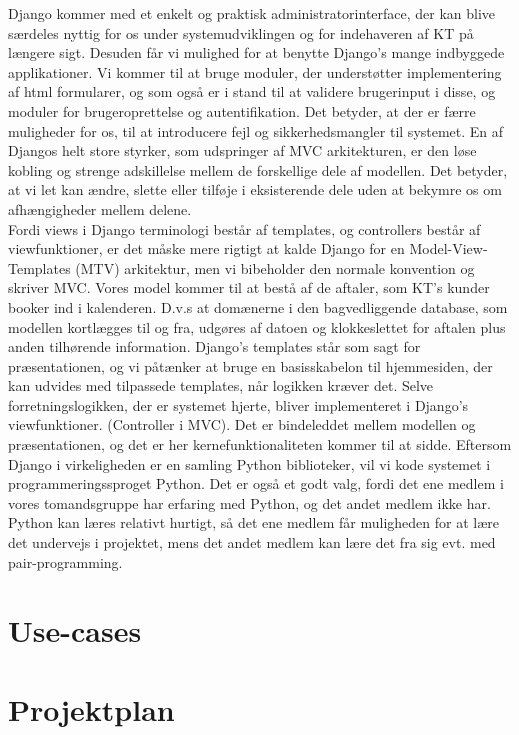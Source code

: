 \documentclass[12pt]{article}   %
\begin{document}
Django kommer med et enkelt og praktisk administratorinterface, der kan blive
særdeles nyttig for os under systemudviklingen og for indehaveren af KT på
længere sigt. Desuden får vi mulighed for at benytte Django's mange indbyggede 
applikationer. Vi kommer til at bruge moduler, der understøtter implementering af
html formularer, og som også er i stand til at validere brugerinput i disse,
og moduler for brugeroprettelse og autentifikation. Det betyder, at der er
færre muligheder for os, til at introducere fejl og sikkerhedsmangler til
systemet. En af Djangos helt store styrker, som udspringer af MVC arkitekturen,
er den løse kobling og strenge adskillelse mellem de forskellige dele af modellen.
Det betyder, at vi let kan ændre, slette eller tilføje i eksisterende dele uden at
bekymre os om afhængigheder mellem delene. \\
Fordi views i Django terminologi består af templates, og controllers består af
viewfunktioner, er det måske mere rigtigt at kalde Django for en Model-View-Templates
(MTV) arkitektur, men vi bibeholder den normale konvention og skriver MVC. Vores
model kommer til at bestå af de aftaler, som KT's kunder booker ind i kalenderen.
D.v.s at domænerne i den bagvedliggende database, som modellen kortlægges til og 
fra, udgøres af datoen og klokkeslettet for aftalen plus anden tilhørende
information. Django's templates står som sagt for præsentationen, og vi
påtænker at bruge en basisskabelon til hjemmesiden, der kan udvides med
tilpassede templates, når logikken kræver det. Selve forretningslogikken, der
er systemet hjerte, bliver implementeret i Django's viewfunktioner.
(Controller i MVC). Det er bindeleddet mellem modellen og præsentationen, og
det er her kernefunktionaliteten kommer til at sidde. Eftersom Django i
virkeligheden er en samling Python biblioteker, vil vi kode systemet i
programmeringssproget Python. Det er også et godt valg, fordi det ene medlem i
vores tomandsgruppe har erfaring med Python, og det andet medlem ikke har.
Python kan læres relativt hurtigt, så det ene medlem får muligheden for at
lære det undervejs i projektet, mens det andet medlem kan lære det fra sig
evt. med pair-programming. \\ 


\section{Use-cases}
\section{Projektplan}
\end{document}
